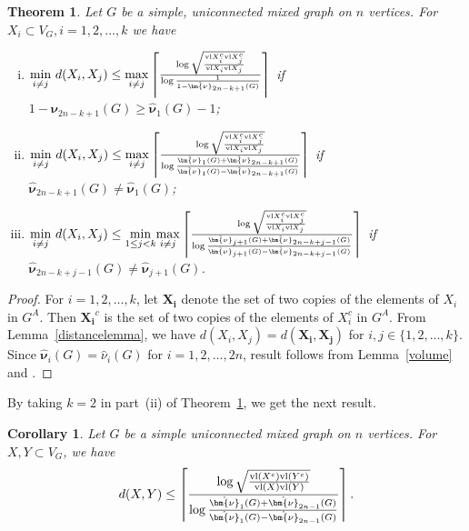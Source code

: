 \documentclass[12pt]{article}
\numberwithin{equation}{section}
\newtheorem{thm}{Theorem}[section]
\newtheorem{cor}{Corollary}[section]
\begin{document}
	\begin{thm}\label{distance}
		Let $G$ be a simple, uniconnected mixed graph on $n$ vertices. For $X_i\subset V_G, i=1,2,\ldots,k$ we have 
		\begin{enumerate}[(i)]
			\item $\underset{i\neq j}{\min}~d(X_i,X_j)\leq \underset{i\neq j}{\max}\left\lceil\frac{\log \sqrt{\frac{\textnormal{vl}X_i^c\textnormal{vl}X_j^c}{\textnormal{vl}X_i\textnormal{vl}X_j}}}{\log \frac{1}{1-\hat{\bm{\nu}}_{2n-k+1}(G)}}\right\rceil$ if $1-\hat{\bm{\nu}}_{2n-k+1}(G)\geq \hat{\bm{\nu}}_{1}(G)-1$;
			\item $\underset{i\neq j}{\min}~d(X_i,X_j)\leq \underset{i\neq j}{\max}\left\lceil\frac{\log \sqrt{\frac{\textnormal{vl}X_i^c\textnormal{vl}X_j^c}{\textnormal{vl}X_i\textnormal{vl}X_j}}}{\log \frac{\hat{\bm{\nu}}_{1}(G)+\hat{\bm{\nu}}_{2n-k+1}(G)}{\hat{\bm{\nu}}_{1}(G)-\hat{\bm{\nu}}_{2n-k+1}(G)}}\right\rceil$ if $\hat{\bm{\nu}}_{2n-k+1}(G)\neq \hat{\bm{\nu}}_{1}(G)$;
			\item $\underset{i\neq j}{\min}~d(X_i,X_j)\leq \underset{1\leq j<k}{\min}\underset{i\neq j}{\max}\left\lceil\frac{\log \sqrt{\frac{\textnormal{vl}X_i^c\textnormal{vl}X_j^c}{\textnormal{vl}X_i\textnormal{vl}X_j}}}{\log \frac{\hat{\bm{\nu}}_{j+1}(G)+\hat{\bm{\nu}}_{2n-k+j-1}(G)}{\hat{\bm{\nu}}_{j+1}(G)-\hat{\bm{\nu}}_{2n-k+j-1}(G)}}\right\rceil$ if $\hat{\bm{\nu}}_{2n-k+j-1}(G)\neq \hat{\bm{\nu}}_{j+1}(G)$.
		\end{enumerate}
	\end{thm}
	\begin{proof}
		For $i=1,2,\ldots,k$, let $\bm{X_i}$ denote the set of two copies of the elements of $X_i$ in $G^A$. 
		Then $\bm{X_i}^c$ is the set of two copies of the elements of $X_i^c$ in $G^A$. From Lemma~\ref{distancelemma}, we have
		$d(X_i,X_j)=d(\bm{X_i},\bm{X_j})$ for $i,j\in\{1,2,\ldots,k\}$. Since $\hat{\bm{\nu}}_i(G)=\hat{\nu}_i(G)$ for $i=1,2,\ldots,2n$, result follows from Lemma~\ref{volume} and \cite[Theorems~3.10, 3.11, 3.12]{chung}.
	\end{proof}
	By taking $k=2$ in part~(ii) of Theorem~\ref{distance}, we get the next result.
	\begin{cor}
		Let $G$ be a simple uniconnected mixed graph on $n$ vertices. For $X,Y\subset V_G$, we have  
		$$d(X,Y)\leq \left\lceil\frac{\log \sqrt{\frac{\textnormal{vl}(X^c)\textnormal{vl}(Y^c)}{\textnormal{vl}(X)\textnormal{vl}(Y)}}}{\log \frac{\hat{\bm{\nu}}_{1}(G)+\hat{\bm{\nu}}_{2n-1}(G)}{\hat{\bm{\nu}}_{1}(G)-\hat{\bm{\nu}}_{2n-1}(G)}}\right\rceil.$$
	\end{cor}
\end{document}
